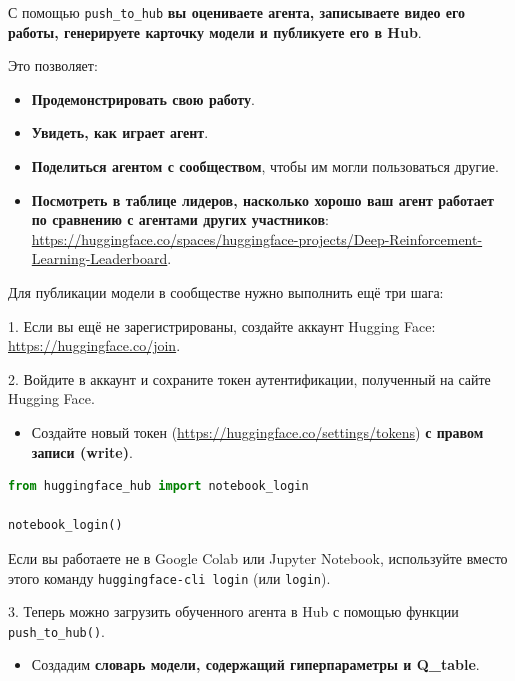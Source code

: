 \documentclass[11pt,a4paper]{article}
\begin{document}
С помощью \passthrough{\lstinline!push_to_hub!} \textbf{вы оцениваете агента, записываете видео его работы, генерируете карточку модели и публикуете его в Hub}.

Это позволяет:

\begin{itemize}
\tightlist
\item
  \textbf{Продемонстрировать свою работу}.
\item
  \textbf{Увидеть, как играет агент}.
\item
  \textbf{Поделиться агентом с сообществом}, чтобы им могли пользоваться другие.
\item
  \textbf{Посмотреть в таблице лидеров, насколько хорошо ваш агент работает по сравнению с агентами других участников}: \url{https://huggingface.co/spaces/huggingface-projects/Deep-Reinforcement-Learning-Leaderboard}.
\end{itemize}

Для публикации модели в сообществе нужно выполнить ещё три шага:

1. Если вы ещё не зарегистрированы, создайте аккаунт Hugging Face: \url{https://huggingface.co/join}.

2. Войдите в аккаунт и сохраните токен аутентификации, полученный на сайте Hugging Face.

\begin{itemize}
\tightlist
\item
  Создайте новый токен (\url{https://huggingface.co/settings/tokens}) \textbf{с правом записи (write)}.
\end{itemize}


\begin{lstlisting}[language=Python]
from huggingface_hub import notebook_login

notebook_login()
\end{lstlisting}

Если вы работаете не в Google Colab или Jupyter Notebook, используйте вместо этого команду \passthrough{\lstinline!huggingface-cli login!} (или \passthrough{\lstinline!login!}).

3. Теперь можно загрузить обученного агента в Hub с помощью функции \passthrough{\lstinline!push_to_hub()!}.

\begin{itemize}
\tightlist
\item
  Создадим \textbf{словарь модели, содержащий гиперпараметры и Q\_table}.
\end{itemize}
\end{document}
